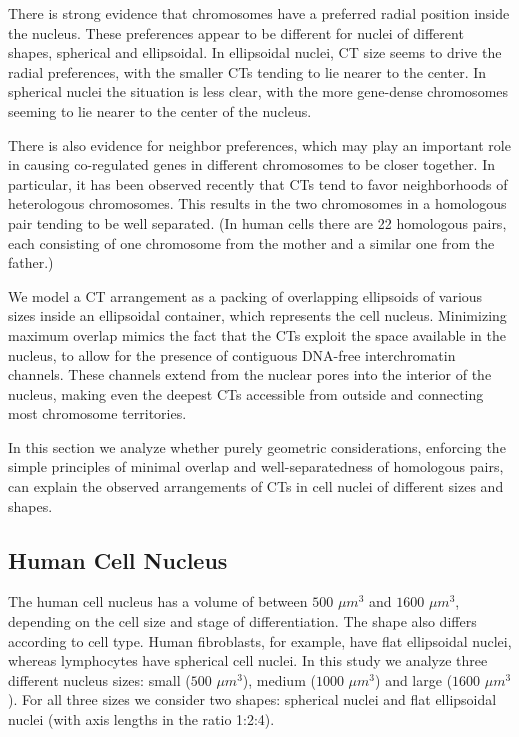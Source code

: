 \documentclass{siamltex}
\begin{document}
There is strong evidence that chromosomes have a preferred radial
position inside the nucleus. These preferences appear to be
different for nuclei of different shapes, spherical and
ellipsoidal. In ellipsoidal nuclei, CT size seems to drive the radial preferences, with the smaller CTs tending to lie nearer to the center. In spherical nuclei the situation is less clear, with the more gene-dense chromosomes seeming to lie nearer to the center of the nucleus. 

There is also evidence for neighbor preferences, which may play an
important role in causing co-regulated genes in different chromosomes
to be closer together. In particular, it has been observed recently
that CTs tend to favor neighborhoods of heterologous chromosomes. This results in the
two chromosomes in a homologous pair tending to be well
separated. (In human cells there are 22 homologous pairs, each consisting
of one chromosome from the mother and a similar one from the
father.)

We model a CT arrangement as a packing of overlapping ellipsoids of
various sizes inside an ellipsoidal container, which represents the
cell nucleus. Minimizing maximum overlap mimics the fact that the CTs
exploit the space available in the nucleus, to allow for the presence
of contiguous DNA-free interchromatin channels. These
channels extend from the nuclear pores into the interior of the
nucleus, making even the deepest CTs accessible from outside and
connecting most chromosome territories.

In this section we analyze whether purely geometric considerations,
enforcing the simple principles of minimal overlap and
well-separatedness of homologous pairs, can explain the observed
arrangements of CTs in cell nuclei of different sizes and shapes.

\subsection{Human Cell Nucleus}

The human cell nucleus has a volume of between $500$ $\mu m^3$ and
$1600$ $\mu m^3$, depending on the cell size and stage of
differentiation.  The shape also differs according to cell type. Human
fibroblasts, for example, have flat ellipsoidal nuclei, whereas
lymphocytes have spherical cell nuclei. In this study we analyze three
different nucleus sizes: small ($500$ $\mu m^3$), medium ($1000$ $\mu
m^3$) and large ($1600$ $\mu m^3$). For all three sizes we consider
two shapes: spherical nuclei and flat ellipsoidal nuclei (with axis
lengths in the ratio 1:2:4).
\end{document}
